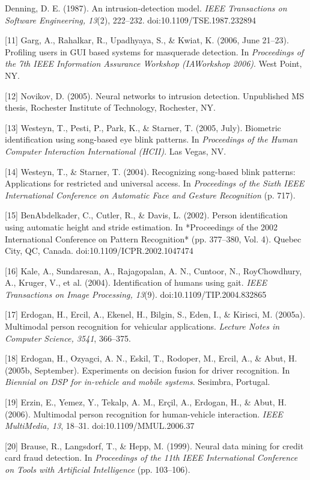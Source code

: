 \documentclass[12pt]{report}
\begin{document}
\begin{raggedright}
[10] Denning, D. E. (1987). An intrusion-detection model. \textit{IEEE Transactions on Software Engineering, 13}(2), 222–232. doi:10.1109/TSE.1987.232894

[11] Garg, A., Rahalkar, R., Upadhyaya, S., \& Kwiat, K. (2006, June 21–23). Profiling users in GUI based systems for masquerade detection. In \textit{Proceedings of the 7th IEEE Information Assurance Workshop (IAWorkshop 2006)}. West Point, NY.

[12] Novikov, D. (2005). Neural networks to intrusion detection. Unpublished MS thesis, Rochester Institute of Technology, Rochester, NY.

[13] Westeyn, T., Pesti, P., Park, K., \& Starner, T. (2005, July). Biometric identification using song-based eye blink patterns. In \textit{Proceedings of the Human Computer Interaction International (HCII)}. Las Vegas, NV.

[14] Westeyn, T., \& Starner, T. (2004). Recognizing song-based blink patterns: Applications for restricted and universal access. In \textit{Proceedings of the Sixth IEEE International Conference on Automatic Face and Gesture Recognition} (p. 717).

[15] BenAbdelkader, C., Cutler, R., \& Davis, L. (2002). Person identification using automatic height and stride estimation. In *Proceedings of the 2002 International Conference on Pattern Recognition* (pp. 377–380, Vol. 4). Quebec City, QC, Canada. doi:10.1109/ICPR.2002.1047474

[16] Kale, A., Sundaresan, A., Rajagopalan, A. N., Cuntoor, N., RoyChowdhury, A., Kruger, V., et al. (2004). Identification of humans using gait. \textit{IEEE Transactions on Image Processing, 13}(9). doi:10.1109/TIP.2004.832865

[17] Erdogan, H., Ercil, A., Ekenel, H., Bilgin, S., Eden, I., \& Kirisci, M. (2005a). Multimodal person recognition for vehicular applications. \textit{Lecture Notes in Computer Science, 3541}, 366–375.

[18] Erdogan, H., Ozyagci, A. N., Eskil, T., Rodoper, M., Ercil, A., \& Abut, H. (2005b, September). Experiments on decision fusion for driver recognition. In \textit{Biennial on DSP for in-vehicle and mobile systems}. Sesimbra, Portugal.

[19] Erzin, E., Yemez, Y., Tekalp, A. M., Erçil, A., Erdogan, H., \& Abut, H. (2006). Multimodal person recognition for human-vehicle interaction. \textit{IEEE MultiMedia, 13}, 18–31. doi:10.1109/MMUL.2006.37

[20] Brause, R., Langsdorf, T., \& Hepp, M. (1999). Neural data mining for credit card fraud detection. In \textit{Proceedings of the 11th IEEE International Conference on Tools with Artificial Intelligence} (pp. 103–106).


\end{raggedright}
\end{document}
